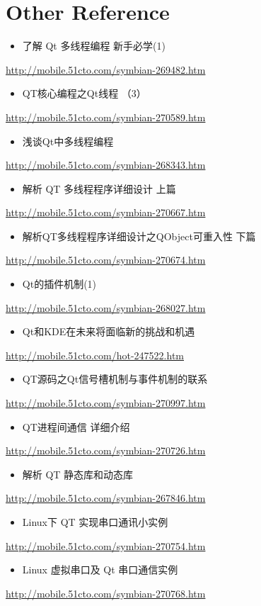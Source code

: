 \documentclass[9pt,b5paper]{article}
\begin{document}
\section{Other Reference}
\label{sec-8}
\begin{itemize}
\item 了解 Qt 多线程编程 新手必学(1)
\end{itemize}
\url{http://mobile.51cto.com/symbian-269482.htm}
\begin{itemize}
\item QT核心编程之Qt线程 （3）
\end{itemize}
\url{http://mobile.51cto.com/symbian-270589.htm}
\begin{itemize}
\item 浅谈Qt中多线程编程
\end{itemize}
\url{http://mobile.51cto.com/symbian-268343.htm}
\begin{itemize}
\item 解析 QT 多线程程序详细设计 上篇
\end{itemize}
\url{http://mobile.51cto.com/symbian-270667.htm}
\begin{itemize}
\item 解析QT多线程程序详细设计之QObject可重入性 下篇
\end{itemize}
\url{http://mobile.51cto.com/symbian-270674.htm}
\begin{itemize}
\item Qt的插件机制(1)
\end{itemize}
\url{http://mobile.51cto.com/symbian-268027.htm}
\begin{itemize}
\item Qt和KDE在未来将面临新的挑战和机遇
\end{itemize}
\url{http://mobile.51cto.com/hot-247522.htm}
\begin{itemize}
\item QT源码之Qt信号槽机制与事件机制的联系
\end{itemize}
\url{http://mobile.51cto.com/symbian-270997.htm}
\begin{itemize}
\item QT进程间通信 详细介绍
\end{itemize}
\url{http://mobile.51cto.com/symbian-270726.htm}
\begin{itemize}
\item 解析 QT 静态库和动态库
\end{itemize}
\url{http://mobile.51cto.com/symbian-267846.htm}
\begin{itemize}
\item Linux下 QT 实现串口通讯小实例
\end{itemize}
\url{http://mobile.51cto.com/symbian-270754.htm}
\begin{itemize}
\item Linux 虚拟串口及 Qt 串口通信实例
\end{itemize}
\url{http://mobile.51cto.com/symbian-270768.htm}
\end{document}
